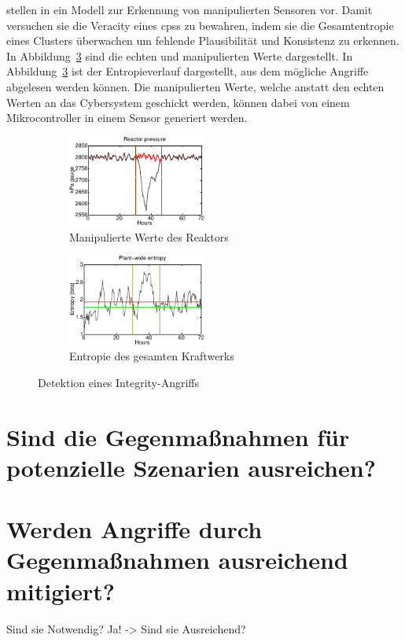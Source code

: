 \documentclass[final,bibliography=totocnumbered]{include/sikseminar}
\newcommand{\cps}{\glspl{cps}\xspace}
\begin{document}
\citeauthor{KLG15} stellen in \cite{KLG15} ein Modell zur Erkennung von manipulierten Sensoren vor.
Damit versuchen sie die Veracity eines \cps zu bewahren, indem sie die Gesamtentropie eines Clusters überwachen um fehlende Plausibilität und Konsistenz zu erkennen.
In Abbildung~\ref{fig:entropie} sind die echten und manipulierten Werte dargestellt.
In Abbildung~\ref{fig:entropie} ist der Entropieverlauf dargestellt, aus dem mögliche Angriffe abgelesen werden können.
Die manipulierten Werte, welche anstatt den echten Werten an das Cybersystem geschickt werden, können dabei von einem Mikrocontroller in einem Sensor generiert werden.
\begin{figure}
    \centering
    \begin{subfigure}[t]{0.4\textwidth}
        \includegraphics[height=3cm]{entropy_a}
        \caption{Manipulierte Werte des Reaktors}
        \label{fig:spoof}
    \end{subfigure}
    \begin{subfigure}[t]{0.4\textwidth}
        \includegraphics[height=3cm]{entropy_b}
        \caption{Entropie des gesamten Kraftwerks}
        \label{fig:entropy_success}
    \end{subfigure}
    \caption{Detektion eines Integrity-Angriffs~\cite{KLG15}}
    \label{fig:entropie}
\end{figure}



\section{Sind die Gegenmaßnahmen für potenzielle Szenarien ausreichen?}\label{sec:diskussion}
\section{Werden Angriffe durch Gegenmaßnahmen ausreichend mitigiert?}\label{sec:diskussion}

Sind sie Notwendig?
Ja! -> Sind sie Ausreichend?


\newpage

\printbibliography
\newpage
\end{document}
